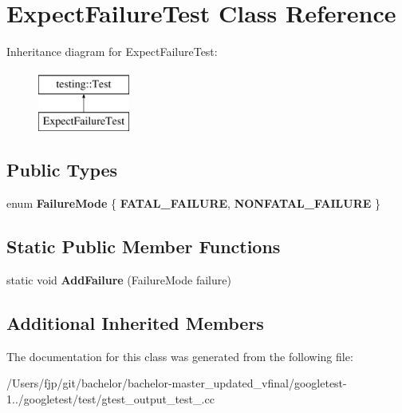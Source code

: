 \hypertarget{class_expect_failure_test}{}\section{Expect\+Failure\+Test Class Reference}
\label{class_expect_failure_test}
Inheritance diagram for Expect\+Failure\+Test\+:\begin{figure}[H]
\begin{center}
\leavevmode
\includegraphics[height=2.000000cm]{class_expect_failure_test}
\end{center}
\end{figure}
\subsection*{Public Types}
\begin{DoxyCompactItemize}
\item 
\mbox{\label{class_expect_failure_test_aad05da10bb15d21a434eba3b37011406}} 
enum {\bfseries Failure\+Mode} \{ {\bfseries F\+A\+T\+A\+L\+\_\+\+F\+A\+I\+L\+U\+RE}, 
{\bfseries N\+O\+N\+F\+A\+T\+A\+L\+\_\+\+F\+A\+I\+L\+U\+RE}
 \}
\end{DoxyCompactItemize}
\subsection*{Static Public Member Functions}
\begin{DoxyCompactItemize}
\item 
\mbox{\label{class_expect_failure_test_ab9aeb7820ff7953fc2975ecc5abd046b}} 
static void {\bfseries Add\+Failure} (Failure\+Mode failure)
\end{DoxyCompactItemize}
\subsection*{Additional Inherited Members}


The documentation for this class was generated from the following file\+:\begin{DoxyCompactItemize}
\item 
/\+Users/fjp/git/bachelor/bachelor-\/master\+\_\+updated\+\_\+vfinal/googletest-\/1../googletest/test/gtest\+\_\+output\+\_\+test\+\_\+.\+cc\end{DoxyCompactItemize}
